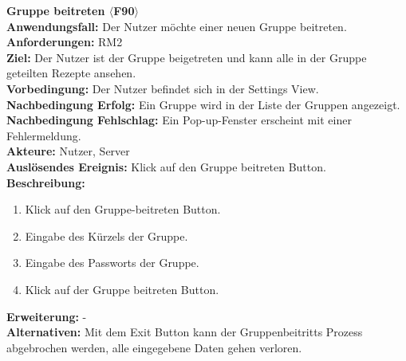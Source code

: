 \documentclass[parskip=full]{scrartcl}
\begin{document}
\textbf{Gruppe beitreten $\langle$F90$\rangle$}\\
\textbf{Anwendungsfall:} Der Nutzer möchte einer neuen Gruppe beitreten.\\
\textbf{Anforderungen:} RM2 \\
\textbf{Ziel:} Der Nutzer ist der Gruppe beigetreten und kann alle in der Gruppe geteilten Rezepte ansehen.\\
\textbf{Vorbedingung:} Der Nutzer befindet sich in der Settings View.\\
\textbf{Nachbedingung Erfolg:} Ein Gruppe wird in der Liste der Gruppen angezeigt.\\
\textbf{Nachbedingung Fehlschlag:} Ein Pop-up-Fenster erscheint mit einer Fehlermeldung.\\
\textbf{Akteure:} Nutzer, Server\\
\textbf{Auslösendes Ereignis:} Klick auf den Gruppe beitreten Button.\\
\textbf{Beschreibung:}\\
\begin{enumerate}
    \item Klick auf den Gruppe-beitreten Button.
    \item Eingabe des Kürzels der Gruppe.
    \item Eingabe des Passworts der Gruppe.
    \item Klick auf der Gruppe beitreten Button.
\end{enumerate}
\textbf{Erweiterung:} -\\
\textbf{Alternativen:} Mit dem Exit Button kann der Gruppenbeitritts Prozess abgebrochen werden, alle eingegebene Daten gehen verloren.\\
\newpage
\end{document}
